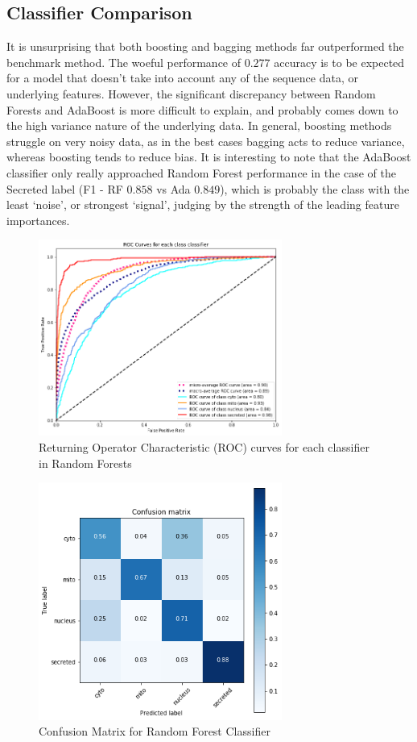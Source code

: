 \documentclass{bioinfo}
\begin{document}
\subsection{Classifier Comparison}

It is unsurprising that both boosting and bagging methods far outperformed the benchmark method. 
The woeful performance of $0.277$ accuracy is to be expected for a model that doesn't take into account any of the sequence data, or underlying features. 
However, the significant discrepancy between Random Forests and AdaBoost is more difficult to explain, and probably comes down to the high variance nature of the underlying data. 
In general, boosting methods struggle on very noisy data, as in the best cases bagging acts to reduce variance, whereas boosting tends to reduce bias. 
It is interesting to note that the AdaBoost classifier only really approached Random Forest performance in the case of the Secreted label (F1 - RF $0.858$ vs Ada $0.849$), which is probably the class with the least `noise', or strongest `signal', judging by the strength of the leading feature importances.

\begin{figure}[!h]
\includegraphics[width=8cm]{roc_curve}
\caption{Returning Operator Characteristic (ROC) curves for each classifier in Random Forests }
\label{fig:roc}
\centering
\end{figure}

\begin{figure}[!h]
\includegraphics[width=8cm]{confusion}
\caption{Confusion Matrix for Random Forest Classifier}
\label{fig:confusion}
\centering
\end{figure}
\end{document}
